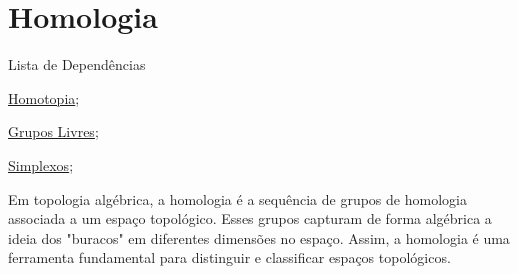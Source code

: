 \section{Homologia}
\label{homologia}

\begin{titlemize}{Lista de Dependências}
    \item \hyperref[homotopia]{Homotopia};\\ %
    \item \hyperref[grupos-livres]{Grupos Livres};\\
    \item \hyperref[simplexo-def]{Simplexos};\\
\end{titlemize}

Em topologia algébrica, a homologia é a sequência de grupos de homologia associada a um espaço topológico. Esses grupos capturam de forma algébrica a ideia dos "buracos" em diferentes dimensões no espaço. Assim, a homologia é uma ferramenta fundamental para distinguir e classificar espaços topológicos.


























